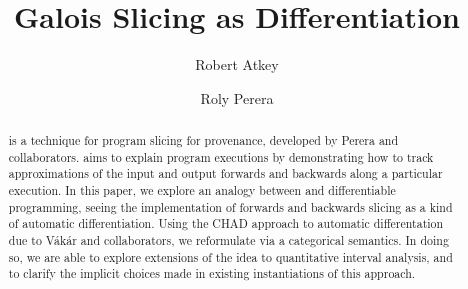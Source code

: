 \documentclass[acmsmall,screen,anonymous,review]{acmart}
\begin{document}
\title{Galois Slicing as Differentiation}

\author{Robert Atkey}

\author{Roly Perera}

\begin{abstract}
  \GPS is a technique for program slicing for provenance, developed by
  Perera and collaborators. \GPS aims to explain program executions by
  demonstrating how to track approximations of the input and output
  forwards and backwards along a particular execution. In this paper,
  we explore an analogy between \GPS and differentiable programming,
  seeing the implementation of forwards and backwards slicing as a kind of automatic
  differentiation. Using the CHAD approach to automatic differentation
  due to V{\'a}k{\'a}r and collaborators, we reformulate \GPS via a
  categorical semantics. In doing so, we are able to explore
  extensions of the \GPS idea to quantitative interval analysis, and
  to clarify the implicit choices made in existing instantiations of this approach.
\end{abstract}
\maketitle












% 
\end{document}
